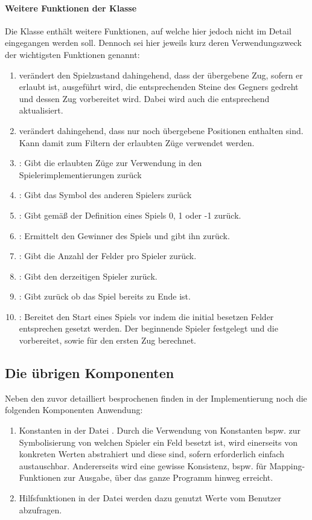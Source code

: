 \paragraph{Weitere Funktionen der Klasse }
Die Klasse  enthält weitere Funktionen, auf welche hier jedoch nicht im Detail eingegangen werden soll. Dennoch sei hier jeweils kurz deren Verwendungszweck der wichtigsten Funktionen genannt:
\begin{enumerate}
\item {} verändert den Spielzustand dahingehend, dass der übergebene Zug, sofern er erlaubt ist, ausgeführt wird, die entsprechenden Steine des Gegners gedreht und dessen Zug vorbereitet wird. Dabei wird auch die  entsprechend aktualisiert.
\item {} verändert  dahingehend, dass nur noch übergebene Positionen enthalten sind. Kann damit zum Filtern der erlaubten Züge verwendet werden.
\item {}: Gibt die erlaubten Züge zur Verwendung in den \\Spielerimplementierungen zurück
\item {}: Gibt das Symbol des anderen Spielers zurück
\item {}: Gibt gemäß der Definition eines Spiels 0, 1 oder -1 zurück.
\item {}: Ermittelt den Gewinner des Spiels und gibt ihn zurück.
\item {}: Gibt die Anzahl der Felder pro Spieler zurück.
\item {}: Gibt den derzeitigen Spieler zurück.
\item {}: Gibt zurück ob das Spiel bereits zu Ende ist.
\item {}: Bereitet den Start eines Spiels vor indem die initial besetzen Felder entsprechen gesetzt werden. Der beginnende Spieler festgelegt und die   vorbereitet, sowie  für den ersten Zug berechnet.
\end{enumerate}
\subsection{Die übrigen Komponenten}
Neben den zuvor detailliert besprochenen finden in der Implementierung noch die folgenden Komponenten Anwendung: 
\begin{enumerate}
\item Konstanten in der Datei . Durch die Verwendung von Konstanten bspw. zur Symbolisierung von welchen Spieler ein Feld besetzt ist, wird einerseits von konkreten Werten abstrahiert und diese sind, sofern erforderlich einfach austauschbar. Andererseits wird eine gewisse Konsistenz, bspw. für Mapping-Funktionen zur Ausgabe, über das ganze Programm hinweg erreicht.
\item Hilfsfunktionen in der Datei  werden dazu genutzt Werte vom Benutzer abzufragen.
\end{enumerate}
